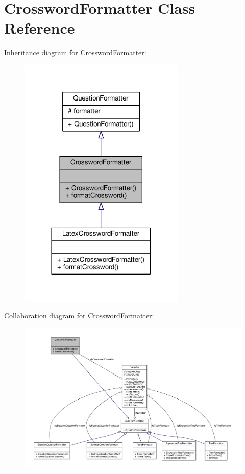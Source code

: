 \hypertarget{classCrosswordFormatter}{}\section{Crossword\+Formatter Class Reference}
\label{classCrosswordFormatter}


Inheritance diagram for Crossword\+Formatter\+:
\nopagebreak
\begin{figure}[H]
\begin{center}
\leavevmode
\includegraphics[width=225pt]{classCrosswordFormatter__inherit__graph}
\end{center}
\end{figure}


Collaboration diagram for Crossword\+Formatter\+:
\nopagebreak
\begin{figure}[H]
\begin{center}
\leavevmode
\includegraphics[width=350pt]{classCrosswordFormatter__coll__graph}
\end{center}
\end{figure}
